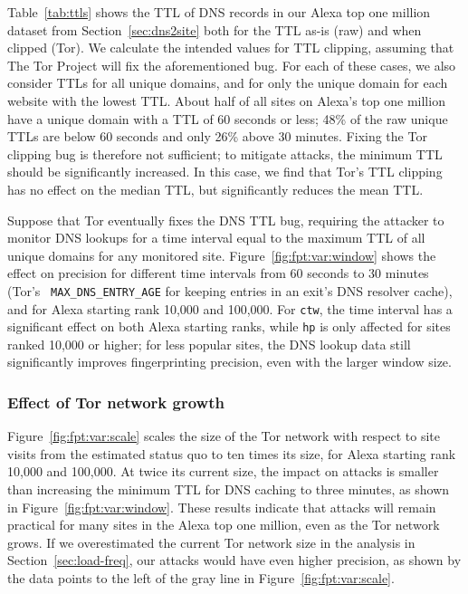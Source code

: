 Table~\ref{tab:ttls} shows the TTL of DNS records in our Alexa top one million
dataset from Section~\ref{sec:dns2site} both for the
TTL as-is (raw) and when clipped (Tor).
We calculate the intended values for TTL clipping, assuming that The Tor Project
will fix the aforementioned bug.
For each of these cases, we
also consider TTLs for all unique domains, and for only the unique
domain for each website with the lowest TTL.  About half of all sites on
Alexa's top one million have a unique domain with a TTL of 60 seconds or
less; 48\% of the raw unique TTLs are below 60 seconds and only 26\%
above 30 minutes. Fixing the Tor clipping bug is therefore not
sufficient; to mitigate \name attacks, the minimum TTL should be
significantly increased.  In this case, we find that Tor's TTL clipping has
no effect on the median TTL, but significantly reduces the mean TTL.

Suppose that Tor eventually fixes the DNS TTL bug, requiring the
attacker to monitor DNS lookups for a time interval equal to the maximum
TTL of all unique domains for any monitored site.
Figure~\ref{fig:fpt:var:window} shows the effect on precision for
different time intervals from 60 seconds to 30 minutes (Tor's {\tt
MAX\_DNS\_ENTRY\_AGE} for keeping entries in an exit's DNS resolver
cache), and for Alexa starting rank 10,000 and 100,000. For \texttt{ctw},
the time interval has a significant effect on both Alexa starting ranks,
while \texttt{hp} is only affected for sites ranked 10,000 or higher;
for less popular sites, the DNS lookup data still significantly improves
fingerprinting precision, even with the larger window size.

\subsubsection{Effect of Tor network growth}
Figure~\ref{fig:fpt:var:scale} scales the size of the Tor network with
respect to site
visits from the estimated status quo to ten times its size, for Alexa starting rank 10,000 and
100,000. At twice its current size, the impact on \name attacks is smaller than
increasing the minimum TTL for DNS caching to three minutes, as shown in
Figure~\ref{fig:fpt:var:window}. These results indicate that \name
attacks will remain
practical for many sites in the Alexa top one million, even as the Tor network grows.
If we overestimated the current Tor network size in the analysis
in Section~\ref{sec:load-freq}, our \name attacks would have even higher
precision, as shown by the data points to the left of the gray line in
Figure~\ref{fig:fpt:var:scale}.

